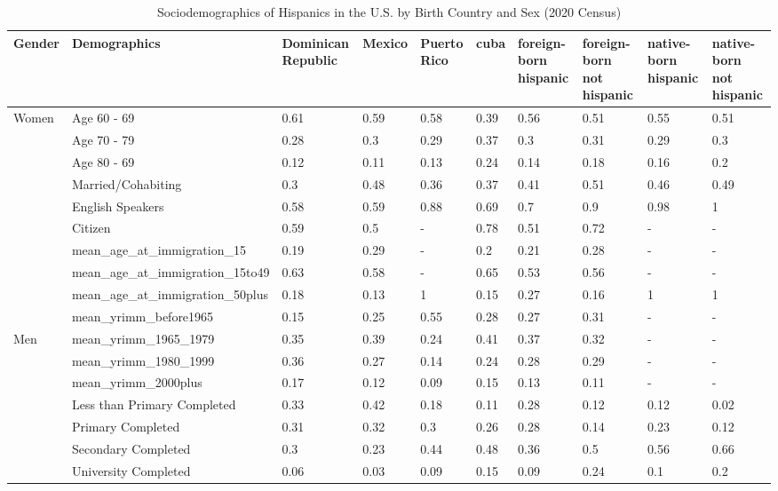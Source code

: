 \begin{table}[ht]
\centering
\caption{Sociodemographics of Hispanics in the U.S. by Birth Country and Sex (2020 Census)} 
\begingroup\small
\begin{tabular}{l|l|llllllll}
  \hline
Gender & Demographics & Dominican Republic & Mexico & Puerto Rico & cuba & foreign-born hispanic & foreign-born not hispanic & native-born hispanic & native-born not hispanic \\ 
  \hline
Women & Age 60 - 69 & 0.61 & 0.59 & 0.58 & 0.39 & 0.56 & 0.51 & 0.55 & 0.51 \\ 
   & Age 70 - 79 & 0.28 & 0.3 & 0.29 & 0.37 & 0.3 & 0.31 & 0.29 & 0.3 \\ 
   & Age 80 - 69 & 0.12 & 0.11 & 0.13 & 0.24 & 0.14 & 0.18 & 0.16 & 0.2 \\ 
   & Married/Cohabiting & 0.3 & 0.48 & 0.36 & 0.37 & 0.41 & 0.51 & 0.46 & 0.49 \\ 
   & English Speakers & 0.58 & 0.59 & 0.88 & 0.69 & 0.7 & 0.9 & 0.98 & 1 \\ 
   & Citizen & 0.59 & 0.5 & - & 0.78 & 0.51 & 0.72 & - & - \\ 
   & mean\_age\_at\_immigration\_15 & 0.19 & 0.29 & - & 0.2 & 0.21 & 0.28 & - & - \\ 
   & mean\_age\_at\_immigration\_15to49 & 0.63 & 0.58 & - & 0.65 & 0.53 & 0.56 & - & - \\ 
   & mean\_age\_at\_immigration\_50plus & 0.18 & 0.13 & 1 & 0.15 & 0.27 & 0.16 & 1 & 1 \\ 
   & mean\_yrimm\_before1965 & 0.15 & 0.25 & 0.55 & 0.28 & 0.27 & 0.31 & - & - \\ 
  Men & mean\_yrimm\_1965\_1979 & 0.35 & 0.39 & 0.24 & 0.41 & 0.37 & 0.32 & - & - \\ 
   & mean\_yrimm\_1980\_1999 & 0.36 & 0.27 & 0.14 & 0.24 & 0.28 & 0.29 & - & - \\ 
   & mean\_yrimm\_2000plus & 0.17 & 0.12 & 0.09 & 0.15 & 0.13 & 0.11 & - & - \\ 
   & Less than Primary Completed & 0.33 & 0.42 & 0.18 & 0.11 & 0.28 & 0.12 & 0.12 & 0.02 \\ 
   & Primary Completed & 0.31 & 0.32 & 0.3 & 0.26 & 0.28 & 0.14 & 0.23 & 0.12 \\ 
   & Secondary Completed & 0.3 & 0.23 & 0.44 & 0.48 & 0.36 & 0.5 & 0.56 & 0.66 \\ 
   & University Completed & 0.06 & 0.03 & 0.09 & 0.15 & 0.09 & 0.24 & 0.1 & 0.2 \\ 

\end{tabular}
\end{table}
